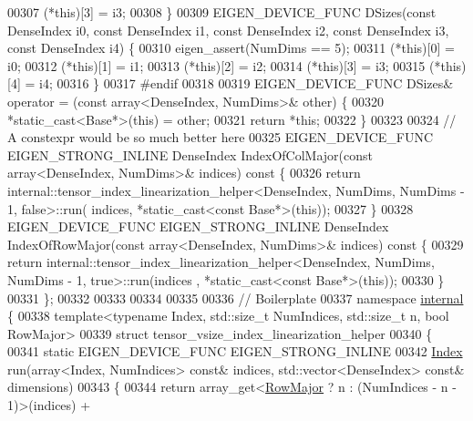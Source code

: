 \begin{DoxyCode}
00307     (*this)[3] = i3;
00308   \}
00309   EIGEN\_DEVICE\_FUNC DSizes(\textcolor{keyword}{const} DenseIndex i0, \textcolor{keyword}{const} DenseIndex i1, \textcolor{keyword}{const} DenseIndex i2, \textcolor{keyword}{const} DenseIndex 
      i3, \textcolor{keyword}{const} DenseIndex i4) \{
00310     eigen\_assert(NumDims == 5);
00311     (*this)[0] = i0;
00312     (*this)[1] = i1;
00313     (*this)[2] = i2;
00314     (*this)[3] = i3;
00315     (*this)[4] = i4;
00316   \}
00317 \textcolor{preprocessor}{#endif}
00318 
00319   EIGEN\_DEVICE\_FUNC DSizes& operator = (\textcolor{keyword}{const} array<DenseIndex, NumDims>& other) \{
00320     *\textcolor{keyword}{static\_cast<}Base*\textcolor{keyword}{>}(\textcolor{keyword}{this}) = other;
00321     \textcolor{keywordflow}{return} *\textcolor{keyword}{this};
00322   \}
00323 
00324   \textcolor{comment}{// A constexpr would be so much better here}
00325   EIGEN\_DEVICE\_FUNC EIGEN\_STRONG\_INLINE DenseIndex IndexOfColMajor(\textcolor{keyword}{const} array<DenseIndex, NumDims>& 
      indices)\textcolor{keyword}{ const }\{
00326     \textcolor{keywordflow}{return} internal::tensor\_index\_linearization\_helper<DenseIndex, NumDims, NumDims - 1, false>::run(
      indices, *static\_cast<const Base*>(\textcolor{keyword}{this}));
00327   \}
00328   EIGEN\_DEVICE\_FUNC EIGEN\_STRONG\_INLINE DenseIndex IndexOfRowMajor(\textcolor{keyword}{const} array<DenseIndex, NumDims>& 
      indices)\textcolor{keyword}{ const }\{
00329     \textcolor{keywordflow}{return} internal::tensor\_index\_linearization\_helper<DenseIndex, NumDims, NumDims - 1, true>::run(indices
      , *static\_cast<const Base*>(\textcolor{keyword}{this}));
00330   \}
00331 \};
00332 
00333 
00334 
00335 
00336 \textcolor{comment}{// Boilerplate}
00337 \textcolor{keyword}{namespace }\hyperlink{namespaceinternal}{internal} \{
00338 \textcolor{keyword}{template}<\textcolor{keyword}{typename} Index, std::\textcolor{keywordtype}{size\_t} NumIndices, std::\textcolor{keywordtype}{size\_t} n, \textcolor{keywordtype}{bool} RowMajor>
00339 \textcolor{keyword}{struct }tensor\_vsize\_index\_linearization\_helper
00340 \{
00341   \textcolor{keyword}{static} EIGEN\_DEVICE\_FUNC EIGEN\_STRONG\_INLINE
00342   \hyperlink{namespace_eigen_a62e77e0933482dafde8fe197d9a2cfde}{Index} run(array<Index, NumIndices> \textcolor{keyword}{const}& indices, std::vector<DenseIndex> \textcolor{keyword}{const}& dimensions)
00343   \{
00344     \textcolor{keywordflow}{return} array\_get<\hyperlink{group__enums_ggaacded1a18ae58b0f554751f6cdf9eb13acfcde9cd8677c5f7caf6bd603666aae3}{RowMajor} ? n : (NumIndices - n - 1)>(indices) +

\end{DoxyCode}
